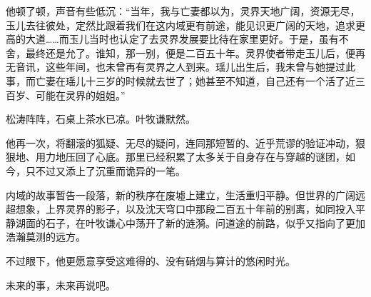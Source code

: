 他顿了顿，声音有些低沉：“当年，我与亡妻都以为，灵界天地广阔，资源无尽，玉儿去往彼处，定然比跟着我们在这内域更有前途，能见识更广阔的天地，追求更高的大道……而玉儿当时也认定了去灵界发展要比待在家里更好。于是，虽有不舍，最终还是允了。谁知，那一别，便是二百五十年。灵界使者带走玉儿后，便再无音讯，这些年间，也未曾再有灵界之人到来。瑶儿出生后，我未曾与她提过此事，而亡妻在瑶儿十三岁的时候就去世了；她甚至不知道，自己还有一个活了近三百岁、可能在灵界的姐姐。”

松涛阵阵，石桌上茶水已凉。叶牧谦默然。

他再一次，将翻滚的狐疑、无尽的疑问，连同那短暂的、近乎荒谬的验证冲动，狠狠地、用力地压回了心底。那里已经积累了太多关于自身存在与穿越的谜团，如今，只不过又添上了沉重而诡异的一笔。

\vspace{2em}

内域的故事暂告一段落，新的秩序在废墟上建立，生活重归平静。但世界的广阔远超想象，上界灵界的影子，以及沈天穹口中那段二百五十年前的别离，如同投入平静湖面的石子，在叶牧谦心中荡开了新的涟漪。问道途的前路，似乎又指向了更加浩瀚莫测的远方。

不过眼下，他更愿意享受这难得的、没有硝烟与算计的悠闲时光。

未来的事，未来再说吧。